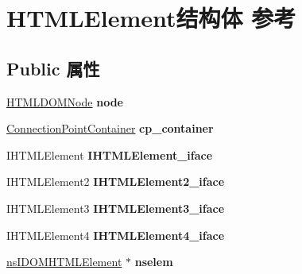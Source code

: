 \hypertarget{struct_h_t_m_l_element}{}\section{H\+T\+M\+L\+Element结构体 参考}
\label{struct_h_t_m_l_element}
\subsection*{Public 属性}
\begin{DoxyCompactItemize}
\item 
\mbox{\label{struct_h_t_m_l_element_a886f19aed199db83f6bc4599ddf12c9f}} 
\hyperlink{struct_h_t_m_l_d_o_m_node}{H\+T\+M\+L\+D\+O\+M\+Node} {\bfseries node}
\item 
\mbox{\label{struct_h_t_m_l_element_a138269cd4f976bfe1eaf4e099fd59d21}} 
\hyperlink{struct_connection_point_container}{Connection\+Point\+Container} {\bfseries cp\+\_\+container}
\item 
\mbox{\label{struct_h_t_m_l_element_a35b816704800fb729efe256ee6c95715}} 
I\+H\+T\+M\+L\+Element {\bfseries I\+H\+T\+M\+L\+Element\+\_\+iface}
\item 
\mbox{\label{struct_h_t_m_l_element_a2c5687280e32d413027f9cb7e09099bd}} 
I\+H\+T\+M\+L\+Element2 {\bfseries I\+H\+T\+M\+L\+Element2\+\_\+iface}
\item 
\mbox{\label{struct_h_t_m_l_element_a586ffdc154279f0d36770c4f7c3e130f}} 
I\+H\+T\+M\+L\+Element3 {\bfseries I\+H\+T\+M\+L\+Element3\+\_\+iface}
\item 
\mbox{\label{struct_h_t_m_l_element_a5df60f7bc10ea225098c9e8125b83b66}} 
I\+H\+T\+M\+L\+Element4 {\bfseries I\+H\+T\+M\+L\+Element4\+\_\+iface}
\item 
\mbox{\label{struct_h_t_m_l_element_a774403123ee107cd38eb074edf9863e9}} 
\hyperlink{interfacens_i_d_o_m_h_t_m_l_element}{ns\+I\+D\+O\+M\+H\+T\+M\+L\+Element} $\ast$ {\bfseries nselem}
\item 
\mbox{\label{struct_h_t_m_l_element_acb4ad14c639435d902f080cb5a888e68}} 

\end{DoxyCompactItemize}
